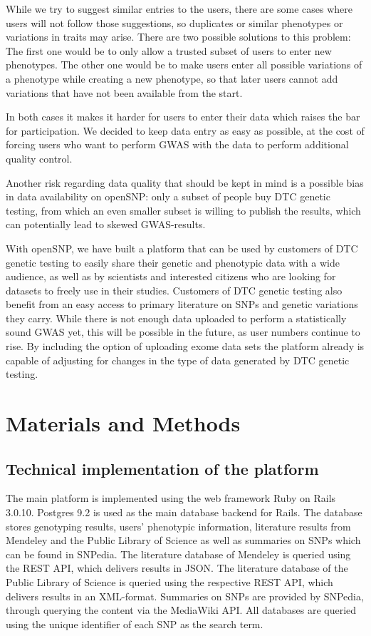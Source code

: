 \documentclass[10pt]{article}
\begin{document}
While we try to suggest similar entries to the users, 
there are some cases where users will not follow those suggestions, so duplicates or similar phenotypes or variations in traits may arise. There are two possible solutions to this problem: The first one would be to only allow a trusted subset of users to enter new phenotypes. The other one 
would be to make users enter all possible variations of a phenotype while creating a new phenotype, so that later users cannot add 
variations that have not been available from the start. 

In both cases it makes it harder 
for users to enter their data which raises the bar for participation.
We decided to keep data entry as easy as possible, at the cost of forcing users who want to perform GWAS with the data to perform additional quality control.

Another risk regarding data quality that should be kept in mind is a possible bias in data availability on openSNP: only a subset of people buy DTC genetic testing, from which an even smaller subset is willing to publish the results, which can potentially lead to skewed GWAS-results.

With openSNP, we have built a platform that can be used by customers of DTC genetic testing to easily share their genetic and phenotypic 
data with a wide audience, as well as by scientists and interested citizens who are looking for datasets to freely use in their studies.
Customers of DTC genetic testing also benefit from an easy access to primary literature on SNPs and genetic variations they carry. 
While there is not enough data uploaded to perform a statistically sound GWAS yet, this will be possible in the future, as user numbers continue to rise. By including the option of uploading exome data sets the platform already is capable of adjusting for changes in the type of data generated by DTC genetic testing.

 
\section*{Materials and Methods}

\subsection*{Technical implementation of the platform}
The main platform is implemented using the web framework Ruby on Rails 3.0.10. Postgres 9.2 is used as the main database backend for Rails. 
The database stores genotyping results, users' phenotypic information, literature results from Mendeley and the Public Library of Science as well as summaries on SNPs 
which can be found in SNPedia. The literature database of Mendeley is queried using the REST API, which delivers results in JSON. The literature database of 
the Public Library of Science is queried using the respective REST API, which delivers results in an XML-format. Summaries on SNPs are provided by SNPedia, 
through querying the content via the MediaWiki API. All databases are queried using the unique identifier of each SNP as the search term. 
\end{document}
